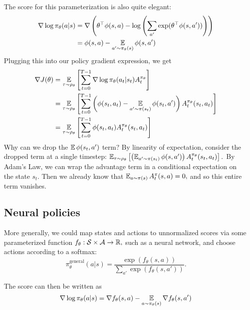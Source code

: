 \documentclass[\main/main]{subfiles}
\begin{document}
The score for this parameterization is also quite elegant: \begin{equation*}
    \begin{split}
        \nabla \log \pi_\theta(a|s) &= \nabla \left( \theta^\top \phi(s, a) - \log \left( \sum_{a'} \exp(\theta^\top \phi(s, a')) \right) \right) \\
        &= \phi(s, a) - \operatorname*{\mathbb{E}}_{a' \sim \pi_\theta(s)} \phi(s, a')
    \end{split}
\end{equation*}
Plugging this into our policy gradient expression, we get \begin{align*}
    \nabla J(\theta) &= \operatorname*{\mathbb{E}}_{\tau \sim \rho_\theta} \left[
        \sum_{t=0}^{T-1} \nabla \log \pi_\theta(a_t | s_t) A_t^{\pi_\theta}
    \right] \\
    &= \operatorname*{\mathbb{E}}_{\tau \sim \rho_\theta} \left[
        \sum_{t=0}^{T-1} \left( \phi(s_t, a_t) - \operatorname*{\mathbb{E}}_{a' \sim \pi(s_t)} \phi(s_t, a') \right) A_t^{\pi_\theta}(s_t, a_t)
    \right] \\
    &= \operatorname*{\mathbb{E}}_{\tau \sim \rho_\theta} \left[ \sum_{t=0}^{T-1} \phi(s_t, a_t) A_t^{\pi_\theta} (s_t, a_t) \right]
\end{align*}
Why can we drop the $\operatorname*{\mathbb{E}} \phi(s_t, a')$ term? By linearity of expectation, consider the dropped term at a single timestep: $\operatorname*{\mathbb{E}}_{\tau \sim \rho_\theta} \left[ \left( \operatorname*{\mathbb{E}}_{a' \sim \pi(s_t)} \phi(s, a') \right) A_t^{\pi_\theta}(s_t, a_t) \right].$ By Adam's Law, we can wrap the advantage term in a conditional expectation on the state $s_t.$ Then we already know that $\operatorname*{\mathbb{E}}_{a \sim \pi(s)} A_t^{\pi}(s, a) = 0,$ and so this entire term vanishes.

\subsection{Neural policies}

More generally, we could map states and actions to unnormalized scores via some parameterized function $f_\theta : \mathcal{S} \times \mathcal{A} \to \mathbb{R},$ such as a neural network, and choose actions according to a softmax: \[
    \pi^\text{general}_\theta(a|s) = \frac{\exp(f_{\theta}(s,a))}{\sum_{a'} \exp(f_{\theta}(s,a'))}.
\]

The score can then be written as \[
    \nabla \log \pi_\theta(a|s) = \nabla f_\theta(s, a) - \operatorname*{\mathbb{E}}_{a \sim \pi_\theta(s)} \nabla f_\theta (s, a')
\]
\end{document}
